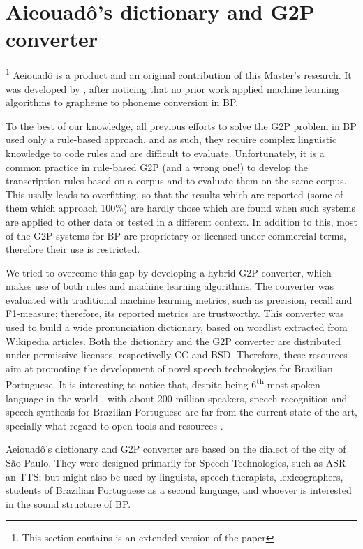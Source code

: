 \chapter{Aieouad\^o's dictionary and G2P converter}\label{ch:aieouado-g2p}

\footnote{This section contains is an extended version of the paper}
Aeiouad\^o is a product and an original contribution of this Master's research. It was developed by \citeauthor{Mendonca2014} \cite{Mendonca2014}, after noticing that no prior work applied machine learning algorithms to grapheme to phoneme conversion in \ac{BP}.

To the best of our knowledge, all previous efforts to solve the G2P problem in \ac{BP} used only a rule-based approach, and as such, they require complex linguistic knowledge to code rules and are difficult to evaluate. Unfortunately, it is a common practice in rule-based G2P (and a wrong one!) to develop the transcription rules based on a corpus and to evaluate them on the same corpus. This usally leads to overfitting, so that the results which are reported (some of them which approach 100\%) are hardly those which are found when such systems are applied to other data or tested in a different context. In addition to this, most of the G2P systems for \ac{BP} are proprietary or licensed under commercial terms, therefore their use is restricted.

We tried to overcome this gap by developing a hybrid G2P converter, which makes use of both rules and machine learning algorithms. The converter was evaluated with traditional machine learning metrics, such as precision, recall and F1-measure; therefore, its reported metrics are trustworthy. This converter was used to build a wide pronunciation dictionary, based on wordlist extracted from Wikipedia articles. Both the dictionary and the G2P converter are distributed under permissive licenses, respectivelly \ac{CC} and \ac{BSD}. Therefore, these resources aim at promoting the development of novel speech technologies for Brazilian Portuguese. It is interesting to notice that, despite being 6\textsuperscript{th} most spoken language in the world \cite{Ethnologue2013}, with about 200 million speakers, speech recognition and speech synthesis for Brazilian Portuguese are far from the current state of the art, specially what regard to open tools and resources \cite{Neto2011}. 

Aeiouad\^o's dictionary and G2P converter are based on the dialect of the city of S\~ao Paulo. They were designed primarily for Speech Technologies, such as \ac{ASR} an \ac{TTS}; but might also be used by linguists, speech therapists, lexicographers, students of Brazilian Portuguese as a second language, and whoever is interested in the sound structure of \ac{BP}.

